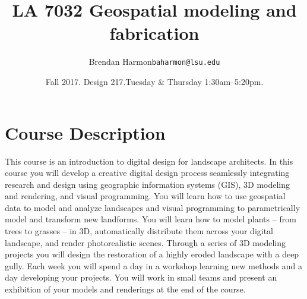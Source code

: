 \documentclass[11pt,article,oneside]{memoir}
\makeatletter
\def\myauthor{Author}
\def\mytitle{Title}
\def\myemail{baharmon@lsu.edu} %
\def\myauthor{Brendan Harmon}
\def\mytitle{{\normalsize \textsc{LA} 7032\newline} \huge \bfseries Geospatial modeling and fabrication}
\newcommand{\globalcolor}[1]{%
  \color{#1}\global\let\default@color\current@color
}
\makeatother
\begin{document}
\setlength\bibitemsep{0.75em}

\setmainfont[Scale=1, Path = fonts/lato/,BoldItalicFont=Lato-RegIta,BoldFont=Lato-Reg,ItalicFont=Lato-LigIta]{Lato-Lig}
\setsansfont[Scale=1, Path = fonts/lato/,BoldItalicFont=Lato-RegIta,BoldFont=Lato-Reg,ItalicFont=Lato-LigIta]{Lato-Lig}
\setmonofont[Mapping=tex-text,Scale=0.8,Path = fonts/inconsolata/]{i}

\def\ind{\hangindent=1 true cm\hangafter=1 \noindent}
\def\labelitemi{$\cdot$}
\title{\LARGE \mytitle}     
\author{\Large\myauthor \newline \footnotesize\texttt{\noindent\myemail}}
\date{Fall 2017. Design 217.\newline Tuesday \& Thursday 1:30am--5:20pm.}
\published{\,}


\globalcolor{black}
\vspace*{-10em}
\maketitle
\clearpage


\globalcolor{black}
\vspace*{-10em}
\maketitle

\section{Course Description}

This course is an introduction to digital design for landscape architects. 
%
In this course you will develop a creative digital design process 
seamlessly integrating research and design
using geographic information systems (GIS),
3D modeling and rendering, and
visual programming. 
%
You will learn how to use geospatial data 
to model and analyze landscapes
and visual programming to 
parametrically model and transform new landforms. 
%
You will learn how to model plants -- from trees to grasses -- in 3D, 
automatically distribute them across your digital landscape,
and render photorealistic scenes. 
%
Through a series of 3D modeling projects you will 
design the restoration of a highly eroded landscape with a deep gully.
%
Each week you will spend a day in a workshop
learning new methods
and a day developing your projects.
%
You will work in small teams and present an exhibition of your
models and renderings at the end of the course.\\
\end{document}
